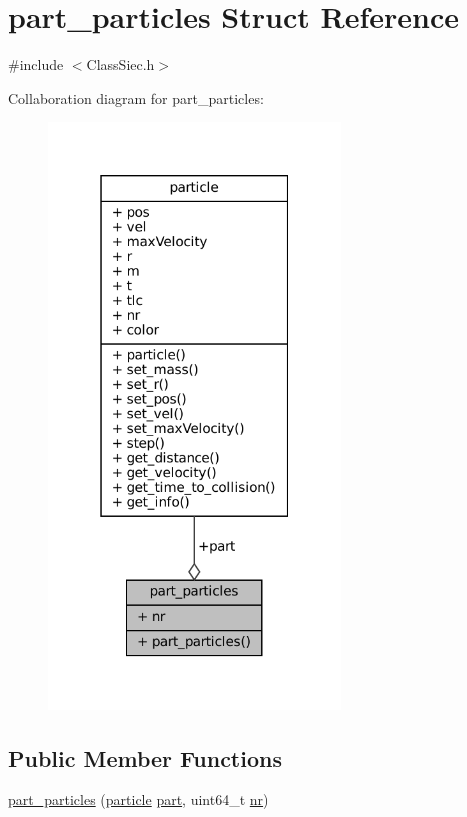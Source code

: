 \hypertarget{structpart__particles}{}\section{part\+\_\+particles Struct Reference}
\label{structpart__particles}


{\ttfamily \#include $<$Class\+Siec.\+h$>$}



Collaboration diagram for part\+\_\+particles\+:\nopagebreak
\begin{figure}[H]
\begin{center}
\leavevmode
\includegraphics[width=220pt]{structpart__particles__coll__graph}
\end{center}
\end{figure}
\subsection*{Public Member Functions}
\begin{DoxyCompactItemize}
\item 
\mbox{\hyperlink{structpart__particles_a8e512b2ab1f29f2d2f11921b1328b4c4}{part\+\_\+particles}} (\mbox{\hyperlink{structparticle}{particle}} \mbox{\hyperlink{structpart__particles_a0f382b0ca436a15a067fdd4086d6e55c}{part}}, uint64\+\_\+t \mbox{\hyperlink{structpart__particles_ae596ac143f70897619e591081481c731}{nr}})
\end{DoxyCompactItemize}
